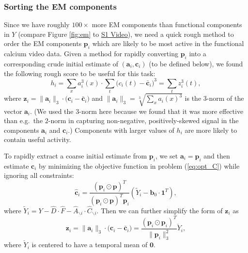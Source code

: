 \documentclass[10pt,letterpaper]{article}
\def \videoOneURL{https://www.dropbox.com/s/0ph27nsx5fxcc1b/demixing_scan_1_201_9100.avi?dl=0}
\begin{document}
{\subsubsection{Sorting the EM components}
Since we have roughly $100\times$ more EM components than functional components in $Y$ (compare Figure \ref{fig:em} to \href{\videoOneURL}{S1 Video}), we need a quick rough method to order the EM components $\bm{p}_i$ which are likely to be most active in the functional calcium video data.  Given a method for rapidly converting $\bm{p}_i$ into a corresponding crude initial estimate of $(\bm{a}_i,\bm{c}_i)$ (to be defined below), we found the following rough score to be useful for this task:
\begin{equation}
     h_i = %
     \sum_{x}{a}_i^3(x)\cdot \sum_t\big({c}_i(t)-\bar{\bm{c}}_i\big)^3= \sum_t z_i^3(t),  \label{eq:hi}
\end{equation}
where $\bm{z}_i =\|{\bm{a}}_i\|_3\cdot \big(\bm{c}_i-\bar{\bm{c}}_i\big)$ and $\|\bm{a}_i\|_3 = \sqrt[3]{\sum_x a_i(x)^3}$ is the $3$-norm of the vector $\bm{a}_i$.  (We used the $3$-norm here because we found that it was more effective than e.g.~the $2$-norm in capturing non-negative, positively-skewed signal in the components $\bm{a}_i$ and $\bm{c}_i$.)  Components with larger values of $h_i$ are more likely to contain useful activity. 


To rapidly extract a coarse initial estimate from $\bm{p}_i$, we set $\bm{a}_i =\bm{p}_i$ and then estimate $\bm{c}_i$ by minimizing the objective function in problem (\ref{eq:opt_C}) while ignoring all constraints:
\begin{equation}
	\hat{\bm{c}}_i = \frac{(\bm{p}_i\odot \bm{p})^T}{(\bm{p}_i\odot \bm{p})^T\bm{p}_i}(\tilde{Y}_i-\bm{b}_0\cdot \bm{1}^T), \label{eq:ci}
\end{equation}
where $\tilde{Y}_i = Y-\hat{D}\cdot \hat{F} - \hat{A}_{\backslash i}\cdot \hat{C}_{\backslash i}$. Then we can further simplify the form of $\bm{z}_i$ as 
\begin{equation}
    \bm{z}_i =\|{\bm{a}}_i\|_3\cdot \big({\bm{c}}_i-\bar{\bm{c}}_i\big) = \frac{(\bm{p}_i\odot \bm{p}_i)^T}{\|\bm{p}_i\|_3^2}\check{Y}_i,
\end{equation}
where $\check{Y}_i$ is centered to have a temporal mean of $\bm{0}$. 

}
\end{document}
